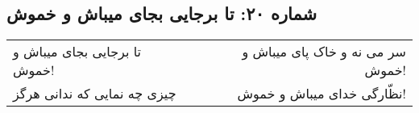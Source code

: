 \begin{center}
\section*{شماره ۲۰: تا برجایی بجای میباش و خموش}
\label{sec:020}
\begin{longtable}{l p{0.5cm} r}
تا برجایی بجای میباش و خموش!
&&
سر می نه و خاک پای میباش و خموش!
\\
چیزی چه نمایی که ندانی هرگز
&&
نظّارگی خدای میباش و خموش!
\\
\end{longtable}
\end{center}

